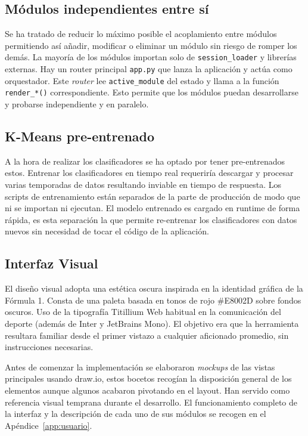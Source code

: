 \documentclass[12pt,a4paper,twoside,openright]{book}
\begin{document}
\subsection{Módulos independientes entre sí}
Se ha tratado de reducir lo máximo posible el acoplamiento entre módulos permitiendo así añadir, modificar o eliminar un módulo sin riesgo de romper los demás.
La mayoría de los módulos importan solo de \lstinline{session_loader} y librerías externas. Hay un router principal \lstinline{app.py} que lanza la aplicación y actúa como orquestador. Este \textit{router} lee \lstinline{active_module} del estado y llama a la función \lstinline{render_*()} correspondiente.
Esto permite que los módulos puedan desarrollarse y probarse independiente y en paralelo.

\subsection{K-Means pre-entrenado}
A la hora de realizar los clasificadores se ha optado por tener pre-entrenados estos. Entrenar los clasificadores en tiempo real requeriría descargar y procesar varias temporadas de datos resultando inviable en tiempo de respuesta.
Los scripts de entrenamiento están separados de la parte de producción de modo que ni se importan ni ejecutan. El modelo entrenado es cargado en runtime de forma rápida, es esta separación la que permite re-entrenar los clasificadores con datos nuevos sin necesidad de tocar el código de la aplicación.

\subsection{Interfaz Visual}
El diseño visual adopta una estética oscura inspirada en la identidad gráfica de la Fórmula 1. Consta de una paleta basada en tonos de rojo \#E8002D sobre fondos oscuros. Uso de la tipografía Titillium Web habitual en la comunicación del deporte (además de Inter y JetBrains Mono). El objetivo era que la herramienta resultara familiar desde el primer vistazo a cualquier aficionado promedio, sin instrucciones necesarias.

\noindent Antes de comenzar la implementación se elaboraron \textit{mockups} de las vistas principales usando draw.io, estos bocetos recogían la disposición general de los elementos aunque algunos acabaron pivotando en el layout. Han servido como referencia visual temprana durante el desarrollo.
\noindent El funcionamiento completo de la interfaz y la descripción de cada uno de sus módulos se recogen en el Apéndice~\ref{app:usuario}.
\end{document}
